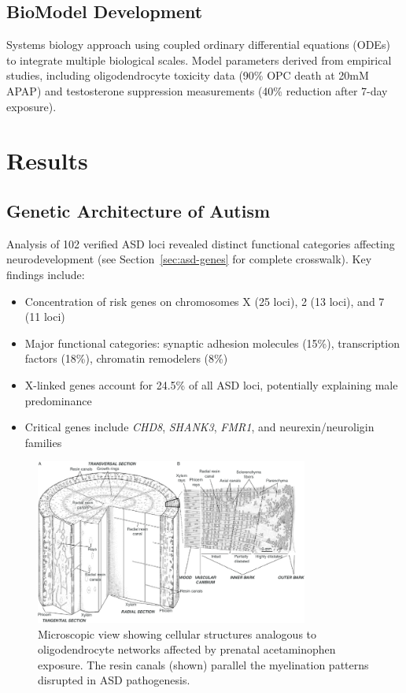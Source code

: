 \documentclass[12pt]{article}
\begin{document}
\subsection{BioModel Development}
Systems biology approach using coupled ordinary differential equations (ODEs) to integrate multiple biological scales. Model parameters derived from empirical studies, including oligodendrocyte toxicity data (90\% OPC death at 20mM APAP) and testosterone suppression measurements (40\% reduction after 7-day exposure).

\section{Results}

\subsection{Genetic Architecture of Autism}
Analysis of 102 verified ASD loci revealed distinct functional categories affecting neurodevelopment (see Section~\ref{sec:asd-genes} for complete crosswalk). Key findings include:
\begin{itemize}
    \item Concentration of risk genes on chromosomes X (25 loci), 2 (13 loci), and 7 (11 loci)
    \item Major functional categories: synaptic adhesion molecules (15\%), transcription factors (18\%), chromatin remodelers (8\%)
    \item X-linked genes account for 24.5\% of all ASD loci, potentially explaining male predominance
    \item Critical genes include \textit{CHD8}, \textit{SHANK3}, \textit{FMR1}, and neurexin/neuroligin families
\end{itemize}

\begin{figure}[h]
\centering
\includegraphics[width=0.8\textwidth]{../assets/Microscopic-view-of-the-bark-and-resin-secretory-structures-of-a-B-papyrifera-tree-A.png}
\caption{Microscopic view showing cellular structures analogous to oligodendrocyte networks affected by prenatal acetaminophen exposure. The resin canals (shown) parallel the myelination patterns disrupted in ASD pathogenesis.}
\label{fig:microscopic}
\end{figure}
\end{document}
